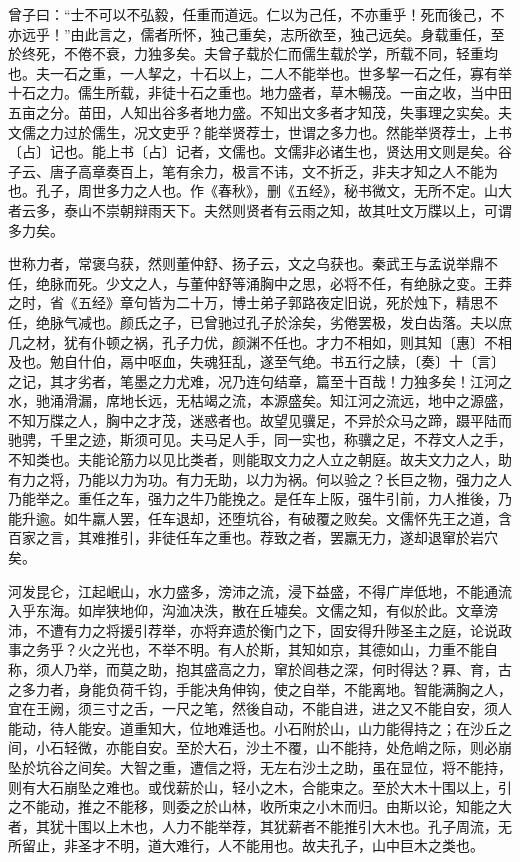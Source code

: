 \documentclass[]{article}
\begin{document}
曾子曰：``士不可以不弘毅，任重而道远。仁以为己任，不亦重乎！死而後己，不亦远乎！''由此言之，儒者所怀，独己重矣，志所欲至，独己远矣。身载重任，至於终死，不倦不衰，力独多矣。夫曾子载於仁而儒生载於学，所载不同，轻重均也。夫一石之重，一人挈之，十石以上，二人不能举也。世多挈一石之任，寡有举十石之力。儒生所载，非徒十石之重也。地力盛者，草木暢茂。一亩之收，当中田五亩之分。苗田，人知出谷多者地力盛。不知出文多者才知茂，失事理之实矣。夫文儒之力过於儒生，况文吏乎？能举贤荐士，世谓之多力也。然能举贤荐士，上书〔占〕记也。能上书〔占〕记者，文儒也。文儒非必诸生也，贤达用文则是矣。谷子云、唐子高章奏百上，笔有余力，极言不讳，文不折乏，非夫才知之人不能为也。孔子，周世多力之人也。作《春秋》，删《五经》，秘书微文，无所不定。山大者云多，泰山不崇朝辩雨天下。夫然则贤者有云雨之知，故其吐文万牒以上，可谓多力矣。

世称力者，常褒乌获，然则董仲舒、扬子云，文之乌获也。秦武王与孟说举鼎不任，绝脉而死。少文之人，与董仲舒等涌胸中之思，必将不任，有绝脉之变。王莽之时，省《五经》章句皆为二十万，博士弟子郭路夜定旧说，死於烛下，精思不任，绝脉气减也。颜氏之子，已曾驰过孔子於涂矣，劣倦罢极，发白齿落。夫以庶几之材，犹有仆顿之祸，孔子力优，颜渊不任也。才力不相如，则其知〔惠〕不相及也。勉自什伯，鬲中呕血，失魂狂乱，遂至气绝。书五行之牍，〔奏〕十〔言〕之记，其才劣者，笔墨之力尤难，况乃连句结章，篇至十百哉！力独多矣！江河之水，驰涌滑漏，席地长远，无枯竭之流，本源盛矣。知江河之流远，地中之源盛，不知万牒之人，胸中之才茂，迷惑者也。故望见骥足，不异於众马之蹄，蹑平陆而驰骋，千里之迹，斯须可见。夫马足人手，同一实也，称骥之足，不荐文人之手，不知类也。夫能论筋力以见比类者，则能取文力之人立之朝庭。故夫文力之人，助有力之将，乃能以力为功。有力无助，以力为祸。何以验之？长巨之物，强力之人乃能举之。重任之车，强力之牛乃能挽之。是任车上阪，强牛引前，力人推後，乃能升逾。如牛羸人罢，任车退却，还堕坑谷，有破覆之败矣。文儒怀先王之道，含百家之言，其难推引，非徒任车之重也。荐致之者，罢羸无力，遂却退窜於岩穴矣。

河发昆仑，江起岷山，水力盛多，滂沛之流，浸下益盛，不得广岸低地，不能通流入乎东海。如岸狭地仰，沟洫决泆，散在丘墟矣。文儒之知，有似於此。文章滂沛，不遭有力之将援引荐举，亦将弃遗於衡门之下，固安得升陟圣主之庭，论说政事之务乎？火之光也，不举不明。有人於斯，其知如京，其德如山，力重不能自称，须人乃举，而莫之助，抱其盛高之力，窜於闾巷之深，何时得达？奡、育，古之多力者，身能负荷千钧，手能决角伸钩，使之自举，不能离地。智能满胸之人，宜在王阙，须三寸之舌，一尺之笔，然後自动，不能自进，进之又不能自安，须人能动，待人能安。道重知大，位地难适也。小石附於山，山力能得持之；在沙丘之间，小石轻微，亦能自安。至於大石，沙土不覆，山不能持，处危峭之际，则必崩坠於坑谷之间矣。大智之重，遭信之将，无左右沙土之助，虽在显位，将不能持，则有大石崩坠之难也。或伐薪於山，轻小之木，合能束之。至於大木十围以上，引之不能动，推之不能移，则委之於山林，收所束之小木而归。由斯以论，知能之大者，其犹十围以上木也，人力不能举荐，其犹薪者不能推引大木也。孔子周流，无所留止，非圣才不明，道大难行，人不能用也。故夫孔子，山中巨木之类也。
\end{document}
